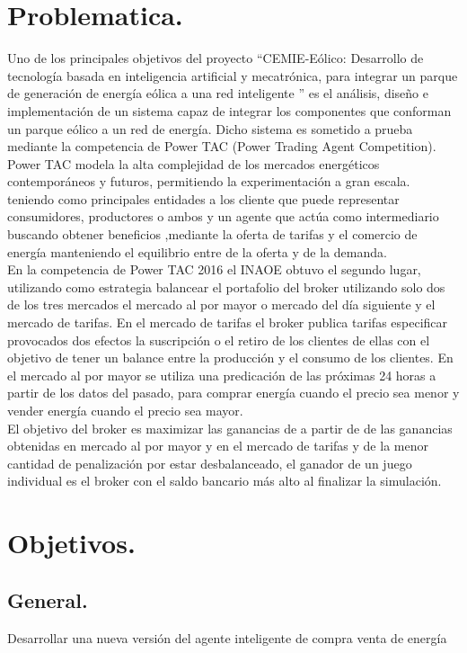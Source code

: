 \section{Problematica.}
Uno de los principales objetivos del proyecto “CEMIE-Eólico: Desarrollo de tecnología basada en inteligencia artificial y mecatrónica, para integrar un parque de generación de energía eólica a una red inteligente  ” es el análisis, diseño e implementación de un sistema capaz de integrar los componentes que conforman un parque eólico a un red de energía. Dicho sistema es sometido a prueba mediante la competencia de Power TAC (Power Trading Agent Competition).
\\

Power TAC modela la alta complejidad de los mercados energéticos contemporáneos y futuros, permitiendo la experimentación a gran escala. teniendo como principales entidades a los cliente que puede representar consumidores,  productores o ambos y un agente que actúa como intermediario buscando obtener beneficios ,mediante la oferta de tarifas y el comercio de energía manteniendo el equilibrio entre de la oferta y de la demanda.
\\
 
En la competencia de Power TAC 2016 el INAOE obtuvo el segundo lugar, utilizando como estrategia balancear el portafolio del broker utilizando solo dos de los tres mercados el mercado al por mayor o mercado del día siguiente y el mercado de tarifas. En el mercado de tarifas el broker publica tarifas especificar provocados dos efectos la suscripción o el retiro de los clientes de ellas con el objetivo de tener un balance entre la producción y el consumo de los clientes. En el mercado al por mayor se utiliza una predicación de las próximas 24 horas a partir de los datos del pasado, para comprar energía cuando el precio sea menor y vender energía cuando el precio sea mayor.
\\
 
El objetivo del broker es maximizar las ganancias de a partir de de las ganancias obtenidas en mercado al por mayor y en el mercado de tarifas y de la menor cantidad de penalización por estar desbalanceado, el ganador de un juego  individual es el broker con el saldo  bancario más alto al finalizar la simulación.

\section{Objetivos.}
\subsection{General.}
Desarrollar una nueva versión del agente inteligente de compra venta de energía
